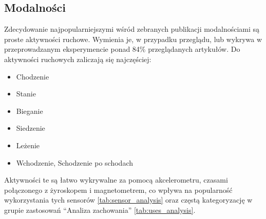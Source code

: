 \subsection{Modalności}
Zdecydowanie najpopularniejszymi wśród zebranych publikacji modalnościami są proste aktywności ruchowe. Wymienia je, w przypadku przeglądu, lub wykrywa w przeprowadzanym eksperymencie ponad 84\% przeglądanych artykułów. Do aktywności ruchowych zaliczają się najczęściej:
\begin{itemize}
    \item Chodzenie
    \item Stanie
    \item Bieganie
    \item Siedzenie
    \item Leżenie
    \item Wchodzenie, Schodzenie po schodach
    \label{base_modalities}
\end{itemize}

Aktywności te są łatwo wykrywalne za pomocą akcelerometru, czasami połączonego z żyroskopem i magnetometrem, co wpływa na popularność wykorzystania tych sensorów \ref{tab:sensor_analysis} oraz częstą kategoryzację w grupie zastosowań ``Analiza zachowania'' \ref{tab:uses_analysis}. 


